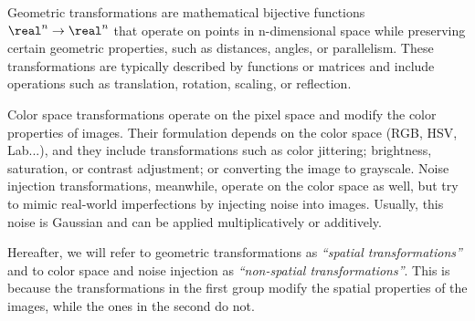 Geometric transformations are mathematical bijective functions $\real^n \rightarrow \real^n$ that operate on points in n-dimensional space while preserving certain geometric properties, such as distances, angles, or parallelism. These transformations are typically described by functions or matrices and include operations such as translation, rotation, scaling, or reflection.

Color space transformations operate on the pixel space and modify the color properties of images. Their formulation depends on the color space (RGB, HSV, Lab...), and they include transformations such as color jittering; brightness, saturation, or contrast adjustment; or converting the image to grayscale. Noise injection transformations, meanwhile, operate on the color space as well, but try to mimic real-world imperfections by injecting noise into images. Usually, this noise is Gaussian and can be applied multiplicatively or additively.

Hereafter, we will refer to geometric transformations as \textit{``spatial transformations''} and to color space and noise injection as \textit{``non-spatial transformations''}. This is because the transformations in the first group modify the spatial properties of the images, while the ones in the second do not.

